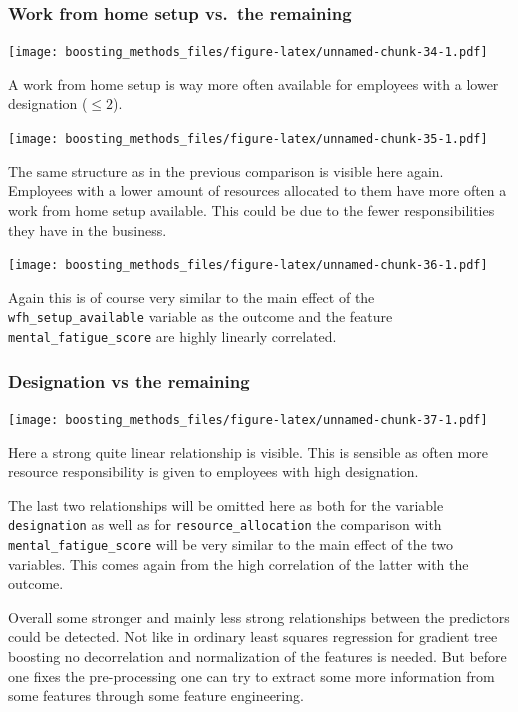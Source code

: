 \documentclass[
]{book}
\begin{document}
\hypertarget{work-from-home-setup-vs.-the-remaining}{%
\subsubsection{Work from home setup vs.~the remaining}\label{work-from-home-setup-vs.-the-remaining}}

\texttt{[image: boosting\_methods\_files/figure-latex/unnamed-chunk-34-1.pdf]}

A work from home setup is way more often available for employees with a lower designation (\(\leq 2\)).

\texttt{[image: boosting\_methods\_files/figure-latex/unnamed-chunk-35-1.pdf]}

The same structure as in the previous comparison is visible here again. Employees with a lower amount of resources allocated to them have more often a work from home setup available. This could be due to the fewer responsibilities they have in the business.

\texttt{[image: boosting\_methods\_files/figure-latex/unnamed-chunk-36-1.pdf]}

Again this is of course very similar to the main effect of the \texttt{wfh\_setup\_available} variable as the outcome and the feature \texttt{mental\_fatigue\_score} are highly linearly correlated.

\hypertarget{designation-vs-the-remaining}{%
\subsubsection{Designation vs the remaining}\label{designation-vs-the-remaining}}

\texttt{[image: boosting\_methods\_files/figure-latex/unnamed-chunk-37-1.pdf]}

Here a strong quite linear relationship is visible. This is sensible as often more resource responsibility is given to employees with high designation.

The last two relationships will be omitted here as both for the variable \texttt{designation} as well as for \texttt{resource\_allocation} the comparison with \texttt{mental\_fatigue\_score} will be very similar to the main effect of the two variables. This comes again from the high correlation of the latter with the outcome.

Overall some stronger and mainly less strong relationships between the predictors could be detected. Not like in ordinary least squares regression for gradient tree boosting no decorrelation and normalization of the features is needed. But before one fixes the pre-processing one can try to extract some more information from some features through some feature engineering.
\end{document}

